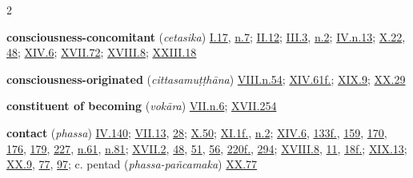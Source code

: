 \begin{multicols}{2}
\begin{vismHanging}
\par\textbf{consciousness-concomitant} (\emph{cetasika}) \hyperlink{I.17}{I.17}{}, \hyperlink{I.n7}{n.7}{}; \hyperlink{II.12}{II.12}{}; \hyperlink{III.3}{III.3}{}, \hyperlink{III.n2}{n.2}{}; \hyperlink{IV.n13}{IV.n.13}{}; \hyperlink{X.22}{X.22}{}, \hyperlink{X.48}{48}{}; \hyperlink{XIV.6}{XIV.6}{}; \hyperlink{XVII.72}{XVII.72}{}; \hyperlink{XVIII.8}{XVIII.8}{}; \hyperlink{XXIII.18}{XXIII.18}{}
\par\textbf{consciousness-originated} (\emph{cittasamuṭṭhāna}) \hyperlink{VIII.n54}{VIII.n.54}{}; \hyperlink{XIV.61}{XIV.61f.}{}; \hyperlink{XIX.9}{XIX.9}{}; \hyperlink{XX.29}{XX.29}{}
\par\textbf{constituent of becoming} (\emph{vokāra}) \hyperlink{VII.n6}{VII.n.6}{}; \hyperlink{XVII.254}{XVII.254}{}
\par\textbf{contact} (\emph{phassa}) \hyperlink{IV.140}{IV.140}{}; \hyperlink{VII.13}{VII.13}{}, \hyperlink{VII.28}{28}{}; \hyperlink{X.50}{X.50}{}; \hyperlink{XI.1}{XI.1f.}{}, \hyperlink{XI.n2}{n.2}{}; \hyperlink{XIV.6}{XIV.6}{}, \hyperlink{XIV.133}{133f.}{}, \hyperlink{XIV.159}{159}{}, \hyperlink{XIV.170}{170}{}, \hyperlink{XIV.176}{176}{}, \hyperlink{XIV.179}{179}{}, \hyperlink{XIV.227}{227}{}, \hyperlink{XIV.n61}{n.61}{}, \hyperlink{XIV.n81}{n.81}{}; \hyperlink{XVII.2}{XVII.2}{}, \hyperlink{XVII.48}{48}{}, \hyperlink{XVII.51}{51}{}, \hyperlink{XVII.56}{56}{}, \hyperlink{XVII.220}{220f.}{}, \hyperlink{XVII.294}{294}{}; \hyperlink{XVIII.8}{XVIII.8}{}, \hyperlink{XVIII.11}{11}{}, \hyperlink{XVIII.18}{18f.}{}; \hyperlink{XIX.13}{XIX.13}{}; \hyperlink{XX.9}{XX.9}{}, \hyperlink{XX.77}{77}{}, \hyperlink{XX.97}{97}{}; c. pentad (\emph{phassa-pañcamaka}) \hyperlink{XX.77}{XX.77}{}

\end{vismHanging}
\end{multicols}
